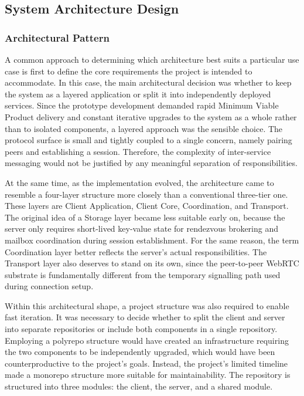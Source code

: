 \documentclass[12pt,a4paper]{article}
\begin{document}
\subsection{System Architecture Design}

\subsubsection{Architectural Pattern}

A common approach to determining which architecture best suits a particular use case is first to define the core requirements the project is intended to accommodate. In this case, the main architectural decision was whether to keep the system as a layered application or split it into independently deployed services. Since the prototype development demanded rapid Minimum Viable Product delivery and constant iterative upgrades to the system as a whole rather than to isolated components, a layered approach was the sensible choice. The protocol surface is small and tightly coupled to a single concern, namely pairing peers and establishing a session. Therefore, the complexity of inter-service messaging would not be justified by any meaningful separation of responsibilities.

At the same time, as the implementation evolved, the architecture came to resemble a four-layer structure more closely than a conventional three-tier one. These layers are Client Application, Client Core, Coordination, and Transport. The original idea of a Storage layer became less suitable early on, because the server only requires short-lived key-value state for rendezvous brokering and mailbox coordination during session establishment. For the same reason, the term Coordination layer better reflects the server’s actual responsibilities. The Transport layer also deserves to stand on its own, since the peer-to-peer WebRTC substrate is fundamentally different from the temporary signalling path used during connection setup.

Within this architectural shape, a project structure was also required to enable fast iteration. It was necessary to decide whether to split the client and server into separate repositories or include both components in a single repository. Employing a polyrepo structure would have created an infrastructure requiring the two components to be independently upgraded, which would have been counterproductive to the project’s goals. Instead, the project’s limited timeline made a monorepo structure more suitable for maintainability. The repository is structured into three modules: the client, the server, and a shared module.
\end{document}
